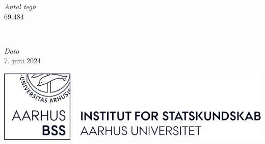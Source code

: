 
	\begin{minipage}{0.4\textwidth}
		\begin{flushleft}
			\large
			\textit{Antal tegn}\\
			69.484\\
		\end{flushleft}
	\end{minipage}
	~
	\begin{minipage}{0.4\textwidth}
		\begin{flushright}
			\large
			\textit{Dato}\\
			7. juni 2024
		\end{flushright}
	\end{minipage}





	\vfill\vfill
	\includegraphics[width=4\textwidth]{format/images/ifsk-logo-black.png}\\[1cm] %
